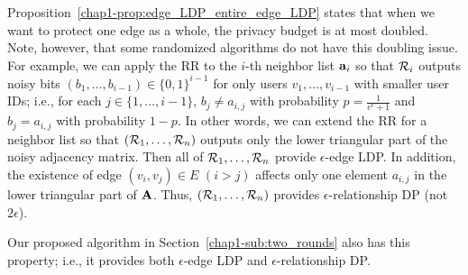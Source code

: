 Proposition~\ref{chap1-prop:edge_LDP_entire_edge_LDP} states that when we want to protect one edge as a whole, the privacy budget is at most doubled. 
Note, however, that 
some randomized algorithms do not have this doubling issue. 
For example, we can apply the RR to the $i$-th neighbor list $\mathbf{a}_i$ so that $\mathcal{R}_i$ outputs noisy bits 
$(b_1, \ldots, b_{i-1}) \in \{0,1\}^{i-1}$ 
for only users 
$v_1, \ldots, v_{i-1}$ with smaller user IDs; 
i.e., 
for each 
$j \in \{1, \ldots, i-1\}$, 
$b_j \neq a_{i,j}$ with probability $p = \frac{1}{e^\epsilon + 1}$ and $b_j = a_{i,j}$ with probability $1-p$. 
In other words, we can extend 
the RR for a neighbor list 
so that $(\mathcal{R}_1, \ldots, \mathcal{R}_n)$ outputs only 
the lower triangular part 
of the noisy adjacency matrix. 
Then all of $\mathcal{R}_1, \ldots, \mathcal{R}_n$ provide $\epsilon$-edge LDP. 
In addition, the existence of edge $(v_i, v_j) \in E$ 
$(i > j)$ 
affects only one element $a_{i,j}$ in 
the lower triangular part 
of $\mathbf{A}$. 
Thus, $(\mathcal{R}_1, \ldots, \mathcal{R}_n)$ provides $\epsilon$-relationship DP (not $2\epsilon$). 

Our proposed algorithm in Section~\ref{chap1-sub:two_rounds} also has this property; i.e., 
it provides both $\epsilon$-edge LDP and $\epsilon$-relationship DP. 


